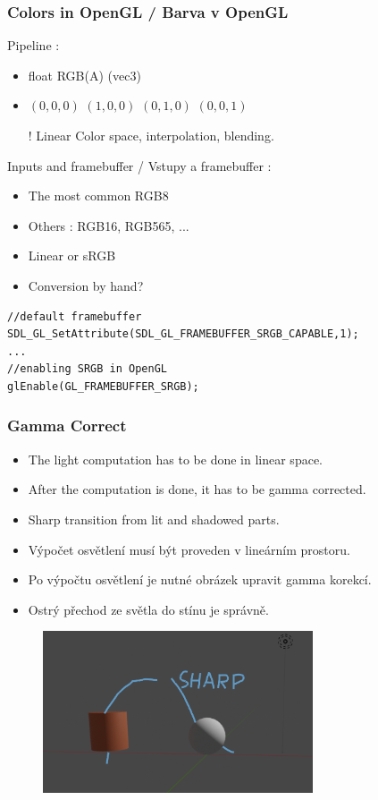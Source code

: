 \begin{frame}[fragile]
    \frametitle{Colors in OpenGL / Barva v OpenGL}

    Pipeline :
    \begin{itemize}
        \item float RGB(A) (vec3)
        \item {\color{black}$(0,0,0)$ \color{red}$(1,0,0)$ \color{green}$(0,1,0)$ \color{blue}$(0,0,1)$}
        \item[\color{red}!] Linear Color space, interpolation, blending.
    \end{itemize}
    \pause\vfill
    Inputs and framebuffer / Vstupy a framebuffer :
    \begin{itemize}
        \item The most common RGB8
        \item Others : RGB16, RGB565, ...
        \item Linear or sRGB
        \item Conversion by hand?
    \end{itemize}
\begin{verbatim}
//default framebuffer
SDL_GL_SetAttribute(SDL_GL_FRAMEBUFFER_SRGB_CAPABLE,1);
...
//enabling SRGB in OpenGL
glEnable(GL_FRAMEBUFFER_SRGB);
\end{verbatim}
\end{frame}

\begin{frame}[fragile]
\frametitle{Gamma Correct}
  \scriptsize
	\begin{itemize}
  \item The light computation has to be done in linear space.
  \item After the computation is done, it has to be gamma corrected.
  \item Sharp transition from lit and shadowed parts.
	\end{itemize}
	\begin{itemize}
  \item Výpočet osvětlení musí být proveden v lineárním prostoru.
  \item Po výpočtu osvětlení je nutné obrázek upravit gamma korekcí.
  \item Ostrý přechod ze světla do stínu je správně.
	\end{itemize}
	\begin{figure}[h]
	\includegraphics[width=8cm,keepaspectratio]{pics/color/gamma_correct}
	\end{figure}
\end{frame}

